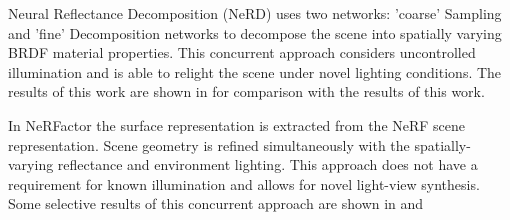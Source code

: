 Neural Reflectance Decomposition (NeRD) \cite{boss2020nerd} uses two networks:
'coarse' Sampling and 'fine' Decomposition networks to decompose the scene into
spatially varying BRDF material properties.
This concurrent approach considers uncontrolled illumination 
and is able to relight the scene under novel lighting conditions.
The results of this work are shown in  for comparison with the results of this work.

In NeRFactor \cite{nerfactor} the surface representation is extracted from the NeRF scene representation.
Scene geometry is refined simultaneously with the spatially-varying reflectance and environment lighting.
This approach does not have a requirement for known illumination
and allows for novel light-view synthesis.
Some selective results of this concurrent approach are shown in  and 









